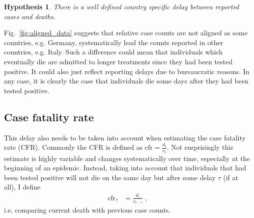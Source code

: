 \documentclass[fullpage,a4paper]{article}
\newcommand{\fig}[1]{Fig.~\ref{fig:#1}}
\newtheorem{hypothesis}{Hypothesis}
\begin{document}
\begin{hypothesis}
  \label{hyp:delay}
  There is a well defined country specific delay between reported
  cases and deaths.
\end{hypothesis}

\fig{aligned_data} suggests that relative case counts are not aligned
as some countries, e.g. Germany, systematically lead the counts
reported in other countries, e.g. Italy. Such a difference could mean
that individuals which eventually die are admitted to longer
treatments since they had been tested positive. It could also just
reflect reporting delays due to bureaucratic reasons. In any case, it
is clearly the case that individuals die some days after they had been
tested positive.

\subsection{Case fatality rate}

This delay also needs to be taken into account when estimating the
case fatality rate (CFR). Commonly the CFR is defined as $\mathrm{cfr}
= \frac{d_t}{c_t}$. Not surprisingly this estimate is highly variable
and changes systematically over time, especially at the beginning of
an epidemic. Instead, taking into account that individuals that had
been tested positive will not die on the same day but after some delay
$\tau$ (if at all), I define
\begin{align}
  \label{eq:cfr}
  \mathrm{cfr}_{\tau} &= \frac{d_t}{c_{t - \tau}} \; ,
\end{align}
i.e. comparing current death with previous case counts.
\end{document}
